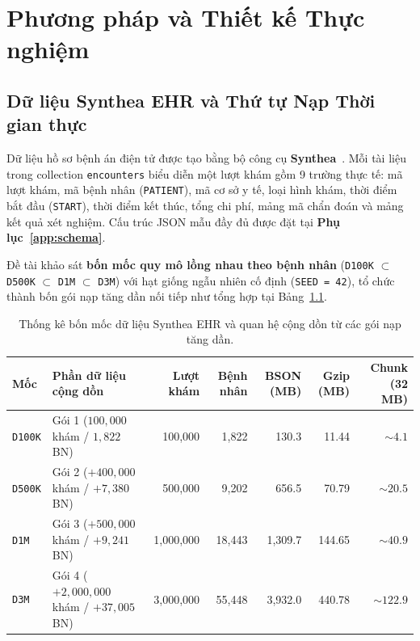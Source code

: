 \chapter{Phương pháp và Thiết kế Thực nghiệm}
\label{chap:methodology}

\section{Dữ liệu Synthea EHR và Thứ tự Nạp Thời gian thực}

Dữ liệu hồ sơ bệnh án điện tử được tạo bằng bộ công cụ \textbf{Synthea}~\cite{Walonoski2018}. Mỗi tài liệu trong collection \texttt{encounters} biểu diễn một lượt khám gồm 9 trường thực tế: mã lượt khám, mã bệnh nhân (\texttt{PATIENT}), mã cơ sở y tế, loại hình khám, thời điểm bắt đầu (\texttt{START}), thời điểm kết thúc, tổng chi phí, mảng mã chẩn đoán và mảng kết quả xét nghiệm. Cấu trúc JSON mẫu đầy đủ được đặt tại \textbf{Phụ lục~\ref{app:schema}}.

Đề tài khảo sát \textbf{bốn mốc quy mô lồng nhau theo bệnh nhân} (\texttt{D100K} $\subset$ \texttt{D500K} $\subset$ \texttt{D1M} $\subset$ \texttt{D3M}) với hạt giống ngẫu nhiên cố định (\texttt{SEED = 42}), tổ chức thành bốn gói nạp tăng dần nối tiếp như tổng hợp tại Bảng~\ref{tab:dataset-stats}.

\begin{table}[!htb]
\centering
\caption{Thống kê bốn mốc dữ liệu Synthea EHR và quan hệ cộng dồn từ các gói nạp tăng dần.}
\label{tab:dataset-stats}
\renewcommand{\arraystretch}{1.2}
\setlength{\tabcolsep}{5pt}
\small
\begin{tabularx}{\linewidth}{l >{\raggedright\arraybackslash}X r r r r r}
\toprule
\textbf{Mốc} & \textbf{Phần dữ liệu cộng dồn} & \textbf{Lượt khám} & \textbf{Bệnh nhân} & \textbf{BSON (MB)} & \textbf{Gzip (MB)} & \textbf{Chunk (32 MB)} \\
\midrule
\texttt{D100K} & Gói 1 ($100{,}000$ khám / $1{,}822$ BN) & 100,000 & 1,822 & 130.3 & 11.44 & $\sim 4.1$ \\
\texttt{D500K} & Gói 2 ($+400{,}000$ khám / $+7{,}380$ BN) & 500,000 & 9,202 & 656.5 & 70.79 & $\sim 20.5$ \\
\texttt{D1M} & Gói 3 ($+500{,}000$ khám / $+9{,}241$ BN) & 1,000,000 & 18,443 & 1,309.7 & 144.65 & $\sim 40.9$ \\
\texttt{D3M} & Gói 4 ($+2{,}000{,}000$ khám / $+37{,}005$ BN) & 3,000,000 & 55,448 & 3,932.0 & 440.78 & $\sim 122.9$ \\
\bottomrule
\end{tabularx}
\end{table}

